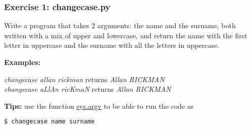 \begin{frame}[c, fragile]
\frametitle{Exercise 1: changecase.py}

\exercise

Write a program that takes 2 arguments: the name and the surname, both written with a mix of upper and lowercase, and return the name with the first letter in uppercase and the surname with all the letters in uppercase.

\textbf{Examples:}

\textit{changecase allan rickman} \hspace{1cm} returns \hspace{1cm}  \textit{Allan RICKMAN} \\
\textit{changecase aLlAn ricKmaN} \hspace{1cm} returns \hspace{1cm}  \textit{Allan RICKMAN} 

\vspace{1cm}

\textbf{Tips:} use the function \href{https://docs.python.org/2/library/sys.html#sys.argv}{sys.argv} to be able to run the code as 
\begin{lstlisting}[language=bash]
$ changecase name surname
\end{lstlisting}


\end{frame}

